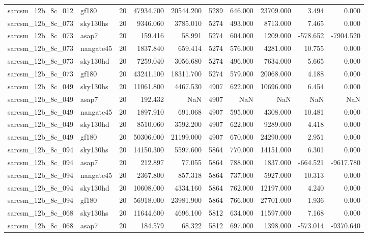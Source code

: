 \begin{longtable}{llrrrrrrrr}
sarcsm\_12b\_8c\_012 & gf180 & 20 & 47934.700 & 20544.200 & 5289 & 646.000 & 23709.000 & 3.494 & 0.000 \\
sarcsm\_12b\_8c\_073 & sky130hs & 20 & 9346.060 & 3785.010 & 5274 & 493.000 & 8713.000 & 7.465 & 0.000 \\
sarcsm\_12b\_8c\_073 & asap7 & 20 & 159.416 & 58.991 & 5274 & 604.000 & 1209.000 & -578.652 & -7904.520 \\
sarcsm\_12b\_8c\_073 & nangate45 & 20 & 1837.840 & 659.414 & 5274 & 576.000 & 4281.000 & 10.755 & 0.000 \\
sarcsm\_12b\_8c\_073 & sky130hd & 20 & 7259.040 & 3056.680 & 5274 & 496.000 & 7634.000 & 5.665 & 0.000 \\
sarcsm\_12b\_8c\_073 & gf180 & 20 & 43241.100 & 18311.700 & 5274 & 579.000 & 20068.000 & 4.188 & 0.000 \\
sarcsm\_12b\_8c\_049 & sky130hs & 20 & 11061.800 & 4467.530 & 4907 & 622.000 & 10696.000 & 6.454 & 0.000 \\
sarcsm\_12b\_8c\_049 & asap7 & 20 & 192.432 & NaN & 4907 & NaN & NaN & NaN & NaN \\
sarcsm\_12b\_8c\_049 & nangate45 & 20 & 1897.910 & 691.068 & 4907 & 595.000 & 4308.000 & 10.481 & 0.000 \\
sarcsm\_12b\_8c\_049 & sky130hd & 20 & 8510.060 & 3592.200 & 4907 & 622.000 & 9289.000 & 4.418 & 0.000 \\
sarcsm\_12b\_8c\_049 & gf180 & 20 & 50306.000 & 21199.000 & 4907 & 670.000 & 24290.000 & 2.951 & 0.000 \\
sarcsm\_12b\_8c\_094 & sky130hs & 20 & 14150.300 & 5597.600 & 5864 & 770.000 & 14151.000 & 6.301 & 0.000 \\
sarcsm\_12b\_8c\_094 & asap7 & 20 & 212.897 & 77.055 & 5864 & 788.000 & 1837.000 & -664.521 & -9617.780 \\
sarcsm\_12b\_8c\_094 & nangate45 & 20 & 2367.800 & 857.318 & 5864 & 737.000 & 5927.000 & 10.313 & 0.000 \\
sarcsm\_12b\_8c\_094 & sky130hd & 20 & 10608.000 & 4334.160 & 5864 & 762.000 & 12197.000 & 4.240 & 0.000 \\
sarcsm\_12b\_8c\_094 & gf180 & 20 & 56918.000 & 23981.900 & 5864 & 766.000 & 27701.000 & 1.936 & 0.000 \\
sarcsm\_12b\_8c\_068 & sky130hs & 20 & 11644.600 & 4696.100 & 5812 & 634.000 & 11597.000 & 7.168 & 0.000 \\
sarcsm\_12b\_8c\_068 & asap7 & 20 & 184.579 & 68.322 & 5812 & 697.000 & 1398.000 & -573.014 & -9370.640 \\

\end{longtable}

